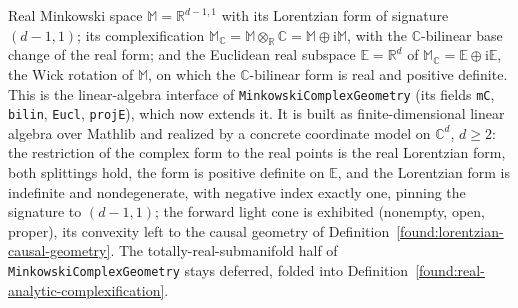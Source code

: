 \begin{definition}
  \label{found:minkowski-linear}
  \leanok
  Real Minkowski space $\mathbb M = \mathbb R^{d-1,1}$ with its Lorentzian form of signature
  $(d-1,1)$; its complexification
  $\mathbb M_{\mathbb C} = \mathbb M \otimes_{\mathbb R} \mathbb C = \mathbb M \oplus \mathrm i
  \mathbb M$, with the $\mathbb C$-bilinear base change of the real form; and the Euclidean real
  subspace $\mathbb E = \mathbb R^d$ of
  $\mathbb M_{\mathbb C} = \mathbb E \oplus \mathrm i \mathbb E$, the Wick rotation of $\mathbb M$,
  on which the $\mathbb C$-bilinear form is real and positive definite. This is the linear-algebra
  interface of \texttt{MinkowskiComplexGeometry} (its fields \texttt{mC}, \texttt{bilin},
  \texttt{Eucl}, \texttt{projE}), which now extends it. It is built as finite-dimensional linear
  algebra over Mathlib and realized by a concrete coordinate model on $\mathbb C^{d}$, $d \ge 2$:
  the restriction of the complex form to the real points is the real Lorentzian form, both
  splittings hold, the form is positive definite on $\mathbb E$, and the Lorentzian form is
  indefinite and nondegenerate, with negative index exactly one, pinning the signature to
  $(d-1,1)$; the forward light cone is exhibited (nonempty, open, proper), its
  convexity left to the causal geometry of
  Definition~\ref{found:lorentzian-causal-geometry}. The totally-real-submanifold half of
  \texttt{MinkowskiComplexGeometry} stays deferred, folded into
  Definition~\ref{found:real-analytic-complexification}.
\end{definition}
